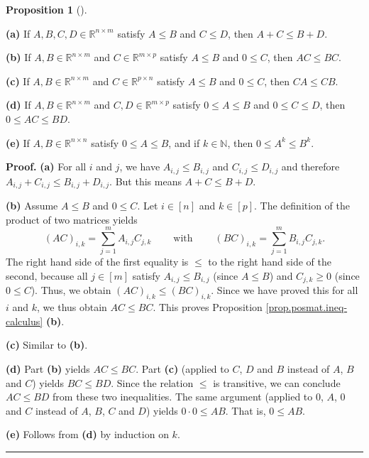 \documentclass[numbers=enddot,12pt,final,onecolumn,notitlepage]{scrartcl}%
\numberwithin{exer}{subsection}
\theoremstyle{definition}
\newtheorem{prop}[theo]{Proposition}
\newenvironment{proposition}[1][]
{\begin{prop}[#1]\begin{leftbar}}
{\end{leftbar}\end{prop}}
\newenvironment{proof}[1][Proof]{\noindent\textbf{#1.} }{\ \rule{0.5em}{0.5em}}
\let\sumnonlimits\sum
\renewcommand{\sum}{\sumnonlimits\limits}
\begin{document}
\begin{proposition}
\label{prop.posmat.ineq-calculus}\textbf{(a)} If $A,B,C,D\in\mathbb{R}%
^{n\times m}$ satisfy $A\leq B$ and $C\leq D$, then $A+C\leq B+D$. \medskip

\textbf{(b)} If $A,B\in\mathbb{R}^{n\times m}$ and $C\in\mathbb{R}^{m\times
p}$ satisfy $A\leq B$ and $0\leq C$, then $AC\leq BC$. \medskip

\textbf{(c)} If $A,B\in\mathbb{R}^{n\times m}$ and $C\in\mathbb{R}^{p\times
n}$ satisfy $A\leq B$ and $0\leq C$, then $CA\leq CB$. \medskip

\textbf{(d)} If $A,B\in\mathbb{R}^{n\times m}$ and $C,D\in\mathbb{R}^{m\times
p}$ satisfy $0\leq A\leq B$ and $0\leq C\leq D$, then $0\leq AC\leq BD$.
\medskip

\textbf{(e)} If $A,B\in\mathbb{R}^{n\times n}$ satisfy $0\leq A\leq B$, and if
$k\in\mathbb{N}$, then $0\leq A^{k}\leq B^{k}$.
\end{proposition}

\begin{proof}
\textbf{(a)} For all $i$ and $j$, we have $A_{i,j}\leq B_{i,j}$ and
$C_{i,j}\leq D_{i,j}$ and therefore $A_{i,j}+C_{i,j}\leq B_{i,j}+D_{i,j}$. But
this means $A+C\leq B+D$. \medskip

\textbf{(b)} Assume $A\leq B$ and $0\leq C$. Let $i\in\left[  n\right]  $ and
$k\in\left[  p\right]  $. The definition of the product of two matrices
yields
\[
\left(  AC\right)  _{i,k}=\sum_{j=1}^{m}A_{i,j}C_{j,k}%
\ \ \ \ \ \ \ \ \ \ \text{with}\ \ \ \ \ \ \ \ \ \ \left(  BC\right)
_{i,k}=\sum_{j=1}^{m}B_{i,j}C_{j,k}.
\]
The right hand side of the first equality is $\leq$ to the right hand side of
the second, because all $j\in\left[  m\right]  $ satisfy $A_{i,j}\leq B_{i,j}$
(since $A\leq B$) and $C_{j,k}\geq0$ (since $0\leq C$). Thus, we obtain
$\left(  AC\right)  _{i,k}\leq\left(  BC\right)  _{i,k}$. Since we have proved
this for all $i$ and $k$, we thus obtain $AC\leq BC$. This proves Proposition
\ref{prop.posmat.ineq-calculus} \textbf{(b)}. \medskip

\textbf{(c)} Similar to \textbf{(b)}. \medskip

\textbf{(d)} Part \textbf{(b)} yields $AC\leq BC$. Part \textbf{(c)} (applied
to $C$, $D$ and $B$ instead of $A$, $B$ and $C$) yields $BC\leq BD$. Since the
relation $\leq$ is transitive, we can conclude $AC\leq BD$ from these two
inequalities. The same argument (applied to $0$, $A$, $0$ and $C$ instead of
$A$, $B$, $C$ and $D$) yields $0\cdot0\leq AB$. That is, $0\leq AB$. \medskip

\textbf{(e)} Follows from \textbf{(d)} by induction on $k$.
\end{proof}
\end{document}
